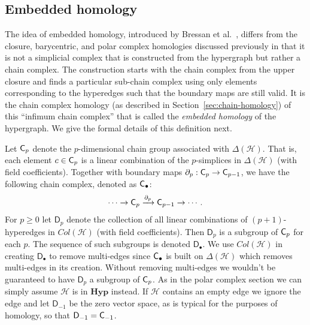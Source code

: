 \documentclass{amsart}
\newcommand{\Hyp}{\mathrm{\textbf{Hyp}}}
\newcommand{\Cgroup}        {\mm{\sf C}}
\newcommand{\Dgroup}	    {\mathsf{D}}
\renewcommand{\H}{\mathcal{H}}
\newcommand{\bdr}{\mm{\mathrm{\partial}}}
\newcommand {\mm}[1]        {\ifmmode{#1}\else{\mbox{\(#1\)}}\fi}
\begin{document}
\subsection{Embedded homology}
\label{sec:embedded}

The idea of embedded homology, introduced by Bressan et al.~\cite{bressan_embedded_2019}, differs from the closure, barycentric, and polar complex homologies discussed previously in that it is not a simplicial complex that is constructed from the hypergraph but rather a chain complex.
The construction starts with the chain complex from the upper closure and finds a particular sub-chain complex using only elements corresponding to the hyperedges such that the boundary maps are still valid. 
It is the chain complex homology (as described in Section~\ref{sec:chain-homology}) of this ``infimum chain complex'' that is called the \emph{embedded homology} of the hypergraph.
We give the formal details of this definition next.

Let $\Cgroup_p$ denote the $p$-dimensional chain group associated with $\Delta(\H)$. 
That is, each element $c \in \Cgroup_p$ is a linear combination of the $p$-simplices in $\Delta(\H)$ (with field coefficients).
Together with boundary maps $\bdr_p: \Cgroup_p \to \Cgroup_{p-1}$, we have the following chain complex, denoted as $\Cgroup_\bullet$:
\begin{align*}
\cdots \to \Cgroup_p \xrightarrow{\bdr_p} \Cgroup_{p-1} \to \cdots.
\end{align*}
For $p \geq 0$ let $\Dgroup_p$ denote the collection of all linear combinations of $(p+1)$-hyperedges in $Col(\H)$ (with field coefficients).
Then $\Dgroup_p$ is a subgroup of $\Cgroup_p$ for each $p$. 
The sequence of such subgroups is denoted  $\Dgroup_\bullet$. 
We use $Col(\H)$ in creating $\Dgroup_\bullet$ to remove multi-edges since $\Cgroup_\bullet$ is built on $\Delta(\H)$ which removes multi-edges in its creation. Without removing multi-edges we wouldn't be guaranteed to have $\Dgroup_p$ a subgroup of $\Cgroup_p$. As in the polar complex section we can simply assume $\H$ is in $\Hyp$ instead. If $\H$ contains an empty edge we ignore the edge and let $\Dgroup_{-1}$ be the zero vector space, as is typical for the purposes of homology, so that $\Dgroup_{-1} = \Cgroup_{-1}$.
\end{document}
